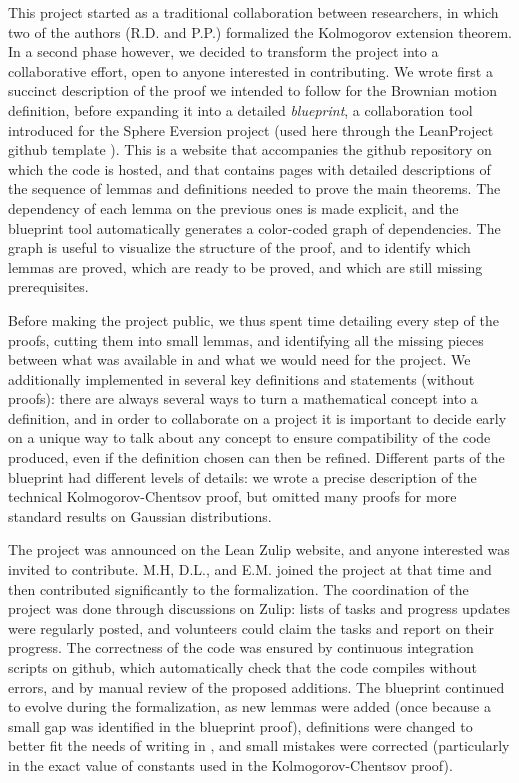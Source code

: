 \documentclass[lean]{Draft}
\begin{document}
This project started as a traditional collaboration between researchers, in which two of the authors (R.D. and P.P.) formalized the Kolmogorov extension theorem.
In a second phase however, we decided to transform the project into a collaborative effort, open to anyone interested in contributing.
We wrote first a succinct description of the proof we intended to follow for the Brownian motion definition, before expanding it into a detailed \emph{blueprint}, a collaboration tool introduced for the Sphere Eversion project \cite{sphere_eversion} (used here through the LeanProject github template \cite{Monticone_LeanProject_2025}).
This is a website that accompanies the github repository on which the code is hosted, and that contains pages with detailed descriptions of the sequence of lemmas and definitions needed to prove the main theorems.
The dependency of each lemma on the previous ones is made explicit, and the blueprint tool automatically generates a color-coded graph of dependencies.
The graph is useful to visualize the structure of the proof, and to identify which lemmas are proved, which are ready to be proved, and which are still missing prerequisites.

Before making the project public, we thus spent time detailing every step of the proofs, cutting them into small lemmas, and identifying all the missing pieces between what was available in \mathlib and what we would need for the project.
We additionally implemented in \Lean several key definitions and statements (without proofs): there are always several ways to turn a mathematical concept into a \Lean definition, and in order to collaborate on a project it is important to decide early on a unique way to talk about any concept to ensure compatibility of the code produced, even if the definition chosen can then be refined.
Different parts of the blueprint had different levels of details: we wrote a precise description of the technical Kolmogorov-Chentsov proof, but omitted many proofs for more standard results on Gaussian distributions.

The project was announced on the Lean Zulip website, and anyone interested was invited to contribute.
M.H, D.L., and E.M. joined the project at that time and then contributed significantly to the formalization.
The coordination of the project was done through discussions on Zulip: lists of tasks and progress updates were regularly posted, and volunteers could claim the tasks and report on their progress.
The correctness of the code was ensured by continuous integration scripts on github, which automatically check that the code compiles without errors, and by manual review of the proposed additions.
The blueprint continued to evolve during the formalization, as new lemmas were added (once because a small gap was identified in the blueprint proof), definitions were changed to better fit the needs of writing in \Lean, and small mistakes were corrected (particularly in the exact value of constants used in the Kolmogorov-Chentsov proof).
\end{document}
